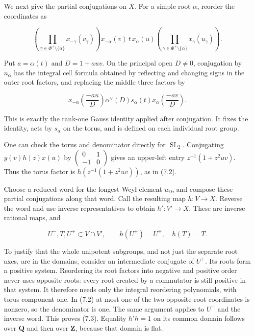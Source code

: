 \documentclass[11pt,a4paper,openany]{report}
\begin{document}
We next give the partial conjugations on \(X\). For a simple root \(\alpha\), reorder the coordinates as

\[
\left(\prod_{\gamma\in\Phi^+\setminus\{\alpha\}}x_{-\gamma}(v_\gamma)\right)
x_{-\alpha}(v)\,t\,x_\alpha(u)
\left(\prod_{\gamma\in\Phi^+\setminus\{\alpha\}}x_\gamma(u_\gamma)\right).
\]

Put \(a=\alpha(t)\) and \(D=1+auv\). On the principal open \(D\ne0\), conjugation by \(n_\alpha\) has the integral cell formula obtained by reflecting and changing signs in the outer root factors, and replacing the middle three factors by

\[
x_{-\alpha}\!\left(\frac{-au}{D}\right)
\alpha^\vee(D)s_\alpha(t)
x_\alpha\!\left(\frac{-av}{D}\right).
\tag{7.2}
\]

This is exactly the rank-one Gauss identity applied after conjugation. It fixes the identity, acts by \(s_\alpha\) on the torus, and is defined on each individual root group.

One can check the torus and denominator directly for \(\operatorname{SL}_2\). Conjugating \(y(v)h(z)x(u)\) by \(\left(\begin{smallmatrix}0&1\\-1&0\end{smallmatrix}\right)\) gives an upper-left entry \(z^{-1}(1+z^2uv)\). Thus the torus factor is \(h(z^{-1}(1+z^2uv))\), as in (7.2).

Choose a reduced word for the longest Weyl element \(w_0\), and compose these partial conjugations along that word. Call the resulting map \(h:V\to X\). Reverse the word and use inverse representatives to obtain \(h':V'\to X\). These are inverse rational maps, and

\[
U^-,T,U^+\subset V\cap V',\qquad
h(U^\pm)=U^\mp,\quad h(T)=T.
\tag{7.3}
\]

To justify that the whole unipotent subgroups, and not just the separate root axes, are in the domains, consider an intermediate conjugate of \(U^+\). Its roots form a positive system. Reordering its root factors into negative and positive order never uses opposite roots: every root created by a commutator is still positive in that system. It therefore needs only the integral reordering polynomials, with torus component one. In (7.2) at most one of the two opposite-root coordinates is nonzero, so the denominator is one. The same argument applies to \(U^-\) and the inverse word. This proves (7.3). Equality \(h'h=1\) on its common domain follows over \(\mathbf Q\) and then over \(\mathbf Z\), because that domain is flat.
\end{document}
